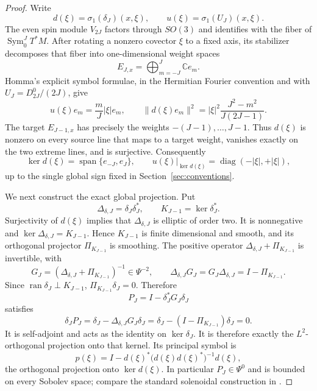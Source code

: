\documentclass[11pt]{article}
\theoremstyle{definition}
\DeclareMathOperator{\Sym}{Sym}
\newcommand{\C}{\mathbb C}
\begin{document}
\begin{proof}
Write
\[
 d(\xi)=\sigma_1(\delta_J)(x,\xi),
 \qquad
 u(\xi)=\sigma_1(U_J)(x,\xi).
\]
The even spin module $V_{2J}$ factors through $SO(3)$ and identifies with
the fiber of $\Sym^J_0T^*M$.  After rotating a nonzero covector $\xi$ to a
fixed axis, its stabilizer decomposes that fiber into one-dimensional weight
spaces
\[
 E_{J,x}=\bigoplus_{m=-J}^{J}\C e_m .
\]
Homma's explicit symbol formulae, in the Hermitian Fourier convention and
with $U_J=D^0_{2J}/(2J)$, give
\begin{equation}
 u(\xi)e_m=\frac mJ|\xi|e_m,
 \qquad
 \|d(\xi)e_m\|^2
 =|\xi|^2\frac{J^2-m^2}{J(2J-1)}.
 \label{eq:operator-fiber-symbols}
\end{equation}
The target $E_{J-1,x}$ has precisely the weights
$-(J-1),\ldots,J-1$.  Thus $d(\xi)$ is nonzero on every source line that
maps to a target weight, vanishes exactly on the two extreme lines, and is
surjective.  Consequently
\[
 \ker d(\xi)=\operatorname{span}\{e_{-J},e_J\},
 \qquad
 u(\xi)|_{\ker d(\xi)}
 =\operatorname{diag}(-|\xi|,+|\xi|),
\]
up to the single global sign fixed in Section~\ref{sec:conventions}.

We next construct the exact global projection.  Put
\[
 \Delta_{\delta,J}=\delta_J\delta_J^*,
 \qquad
 K_{J-1}=\ker\delta_J^* .
\]
Surjectivity of $d(\xi)$ implies that $\Delta_{\delta,J}$ is elliptic of
order two.  It is nonnegative and
$\ker\Delta_{\delta,J}=K_{J-1}$.  Hence $K_{J-1}$ is finite dimensional and
smooth, and its orthogonal projector $\Pi_{K_{J-1}}$ is smoothing.  The
positive operator $\Delta_{\delta,J}+\Pi_{K_{J-1}}$ is invertible, with
\[
 G_J=(\Delta_{\delta,J}+\Pi_{K_{J-1}})^{-1}\in\Psi^{-2},
 \qquad
 \Delta_{\delta,J}G_J
 =G_J\Delta_{\delta,J}=I-\Pi_{K_{J-1}}.
\]
Since $\operatorname{ran}\delta_J\perp K_{J-1}$,
$\Pi_{K_{J-1}}\delta_J=0$.  Therefore
\[
 P_J=I-\delta_J^*G_J\delta_J
\]
satisfies
\[
 \delta_JP_J
 =\delta_J-\Delta_{\delta,J}G_J\delta_J
 =\delta_J-(I-\Pi_{K_{J-1}})\delta_J=0.
\]
It is self-adjoint and acts as the identity on $\ker\delta_J$.  It is
therefore exactly the $L^2$-orthogonal projection onto that kernel.  Its
principal symbol is
\begin{equation}
 p(\xi)=I-d(\xi)^*
 \bigl(d(\xi)d(\xi)^*\bigr)^{-1}d(\xi),
 \label{eq:solenoidal-symbol}
\end{equation}
the orthogonal projection onto $\ker d(\xi)$.  In particular
$P_J\in\Psi^0$ and is bounded on every Sobolev space; compare the standard
solenoidal construction in \cite{GouezelLefeuvre2021}.


\end{proof}
\end{document}
